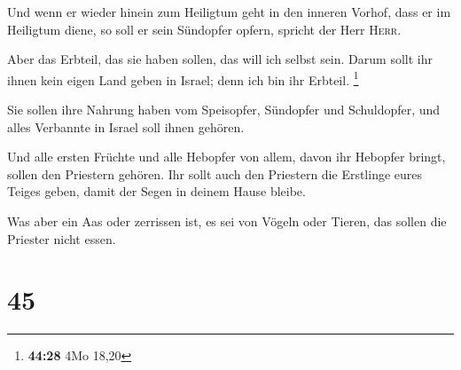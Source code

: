  Und wenn er wieder hinein zum Heiligtum geht in den
inneren Vorhof, dass er im Heiligtum diene, so soll er sein Sündopfer
opfern, spricht der Herr \textsc{Herr}.

 Aber das Erbteil, das sie haben sollen, das will ich
selbst sein. Darum sollt ihr ihnen kein eigen Land geben in Israel; denn
ich bin ihr Erbteil. \footnote{\textbf{44:28} 4Mo 18,20}

 Sie sollen ihre Nahrung haben vom Speisopfer, Sündopfer
und Schuldopfer, und alles Verbannte in Israel soll ihnen gehören.

 Und alle ersten Früchte und alle Hebopfer von allem,
davon ihr Hebopfer bringt, sollen den Priestern gehören. Ihr sollt auch
den Priestern die Erstlinge eures Teiges geben, damit der Segen in
deinem Hause bleibe.

 Was aber ein Aas oder zerrissen ist, es sei von Vögeln
oder Tieren, das sollen die Priester nicht essen.

\hypertarget{section-44}{%
\section{45}\label{section-44}}

